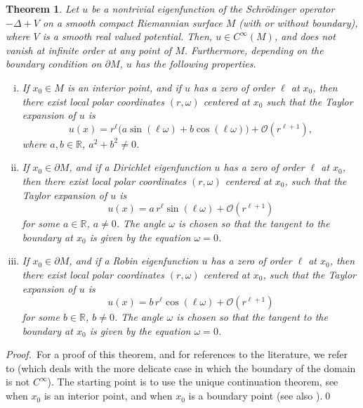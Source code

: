 \documentclass[12pt,a4paper]{amsart}
\theoremstyle{plain} %
\newtheorem{theorem}{Theorem}[section]
\theoremstyle{definition}
\numberwithin{equation}{section}
\numberwithin{figure}{section}
\numberwithin{table}{section}
\newcommand{\R}{\mathbb{R}}
\newcommand{\cO}{\mathcal{O}}
\newcommand{\pf}{\emph{Proof.~}}
\begin{document}
\begin{theorem} \label{T-nodinfo}
Let $u$ be a nontrivial eigenfunction of the Schr\"odinger operator $-\Delta +V$ on a smooth compact Riemannian surface $M$ (with or without boundary),  where $V$ is a smooth real valued  potential. Then, $u\in C^\infty(M)$,  and does not vanish at infinite order at any point of $M$. Furthermore, depending on the boundary condition on $\partial M$, $u$ has the following  properties.
\begin{enumerate}[(i)]
\item If $x_0\in M$ is an interior point, and if $u$ has a zero of order $\ell$ at $x_0$, then there exist local polar coordinates $(r,\omega)$ centered at $x_0$ such that the Taylor expansion of $u$ is
\begin{equation}\label{E-harmpoly}
u(x)=r^{\ell} \big( a \sin(\ell \omega) + b \cos(\ell \omega) \big) +\cO(r^{\ell+1}),
\end{equation}
%
where $a,b \in \R$, $a^2+b^2 \not = 0$.

\item If $x_0\in \partial M$, and if a Dirichlet eigenfunction $u$ has a zero of order $\ell$ at $x_0$, then there exist local polar coordinates $(r,\omega)$ centered at $x_0$, such that the Taylor expansion of $u$ is
\begin{equation}\label{E-sinexp}
u(x)=a\, r^\ell \sin(\ell \omega) +\cO(r^{\ell +1})
\end{equation}
for some $a\in\mathbb R$, $a \not = 0$. The angle $\omega$ is chosen so that the tangent to the boundary at $x_0$ is given by the equation $\omega=0$.

\item If $x_0\in \partial M$, and if a Robin eigenfunction $u$ has a zero of order $\ell$ at $x_0$, then there exist local polar coordinates $(r,\omega)$ centered at $x_0$, such that the Taylor expansion of $u$ is
\begin{equation}\label{E-cosexp}
u(x)=b\, r^\ell \cos(\ell \omega) +\cO(r^{\ell +1})
\end{equation}
for some $b\in\mathbb R$, $b \not = 0$. The angle $\omega$ is chosen so that the tangent to the boundary at $x_0$ is given by the equation $\omega=0$.
\end{enumerate}
\end{theorem}

\pf For a proof of this theorem, and for references to the literature, we refer to \cite[Appendix~A]{GiHe2019}  (which deals with the more delicate case in which the boundary of the domain is not $C^{\infty}$). The starting point is to use the unique continuation theorem, see \cite{Aron1957} when $x_0$ is an interior point, and \cite{DoFe1990a} when $x_0$ is a boundary point  (see also \cite{YaZh2021}).\hfill \qed \medskip
\end{document}

